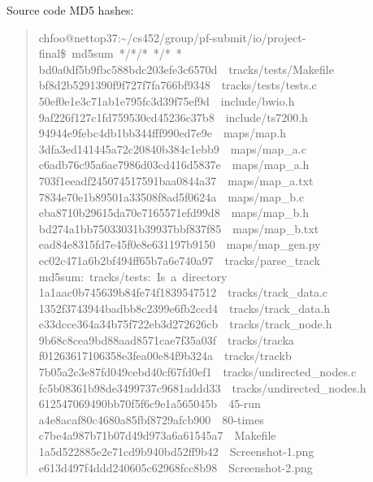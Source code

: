 \documentclass[letterpaper]{article}
\begin{document}
Source code MD5 hashes:
%
\begin{quote}{\ttfamily \raggedright \noindent
chfoo@nettop37:\textasciitilde{}/cs452/group/pf-submit/io/project-final\$~md5sum~*/*/*~*/*~*\\
bd0a0df5b9fbc588bdc203efe3c6570d~~tracks/tests/Makefile\\
bf8d2b5291390f9f727f7fa766bf9348~~tracks/tests/tests.c\\
50ef0e1e3c71ab1e795fc3d39f75ef9d~~include/bwio.h\\
9af226f127c1fd759530cd45236c37b8~~include/ts7200.h\\
94944e9febc4db1bb344fff990ed7e9e~~maps/map.h\\
3dfa3ed141445a72c20840b384c1ebb9~~maps/map\_a.c\\
c6adb76c95a6ae7986d03cd416d5837e~~maps/map\_a.h\\
703f1eeadf245074517591baa0844a37~~maps/map\_a.txt\\
7834e70e1b89501a33508f8ad5f0624a~~maps/map\_b.c\\
eba8710b29615da70e7165571efd99d8~~maps/map\_b.h\\
bd274a1bb75033031b39937bbf837f85~~maps/map\_b.txt\\
ead84e8315fd7e45f0e8e631197b9150~~maps/map\_gen.py\\
ec02c471a6b2bf494ff65b7a6e740a97~~tracks/parse\_track\\
md5sum:~tracks/tests:~Is~a~directory\\
1a1aac0b745639b84fe74f1839547512~~tracks/track\_data.c\\
1352f3743944badbb8c2399e6fb2ccd4~~tracks/track\_data.h\\
e33dcce364a34b75f722eb3d272626cb~~tracks/track\_node.h\\
9b68c8cea9bd88aad8571cae7f35a03f~~tracks/tracka\\
f01263617106358e3fea00e84f9b324a~~tracks/trackb\\
7b05a2c3e87fd049cebd40cf67fd0ef1~~tracks/undirected\_nodes.c\\
fc5b08361b98de3499737c9681addd33~~tracks/undirected\_nodes.h\\
612547069490bb70f5f6c9e1a565045b~~45-run\\
a4e8acaf80c4680a85fbf8729afcb900~~80-times\\
c7be4a987b71b07d49d973a6a61545a7~~Makefile\\
1a5d522885e2e71cd9b940bd52ff9b42~~Screenshot-1.png\\
e613d497f4ddd240605c62968fcc8b98~~Screenshot-2.png\\
}
\end{quote}
\end{document}
